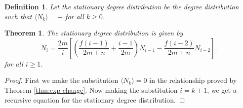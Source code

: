 \documentclass[a4paper,10pt]{article}
\newtheorem{defn}{Definition}
\newtheorem{theorem}{Theorem}
\begin{document}
\begin{defn}
Let the stationary degree distribution be the degree distribution such that $\langle N_k \rangle = -$ for all $k \geq 0$. 
\end{defn}

\begin{theorem}
\label{thm:stationary-dd}
The stationary degree distribution is given by 
\begin{equation*}
\label{eqn:N_i}
 N_{i} = \frac{2m}{i}\left[\left( \frac{f(i - 1)}{2m + n} + \frac{i - 1}{2m} \right) N_{i - 1} -  \frac{f(i - 2)}{2m + n} N_{i - 2}\right].
\end{equation*}
for all $i \geq 1$.
\end{theorem}
\begin{proof}
 First we make the substitution $\langle N_k \rangle = 0$ in the relationship proved by Theorem \ref{thm:exp-change}. Now making the substitution $i = k + 1$, we get a recursive equation for the stationary degree distribution.
\end{proof}
\end{document}

